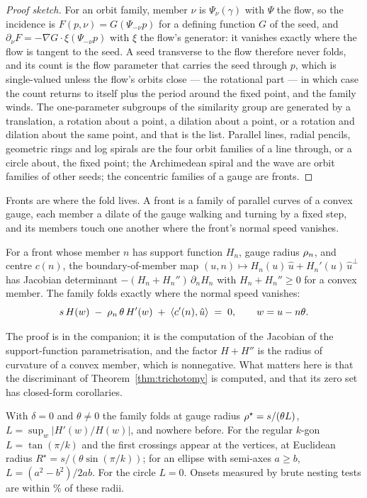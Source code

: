 \begin{proof}[Proof sketch]
For an orbit family, member $\nu$ is $\Psi_\nu(\gamma)$ with $\Psi$ the flow,
so the incidence is $F(p,\nu)=G(\Psi_{-\nu}p)$ for a defining function $G$
of the seed, and $\partial_\nu F=-\nabla G\cdot\xi(\Psi_{-\nu}p)$ with $\xi$
the flow's generator: it vanishes exactly where the flow is tangent to the
seed. A seed transverse to the flow therefore never folds, and its count is
the flow parameter that carries the seed through $p$, which is single-valued
unless the flow's orbits close --- the rotational part --- in which case the
count returns to itself plus the period around the fixed point, and the
family winds. The one-parameter subgroups of the similarity group are
generated by a translation, a rotation about a point, a dilation about a
point, or a rotation and dilation about the same point, and that is the list.
Parallel lines, radial pencils, geometric rings and log spirals are the four
orbit families of a line through, or a circle about, the fixed point; the
Archimedean spiral and the wave are orbit families of other seeds; the
concentric families of a gauge are fronts.
\end{proof}

Fronts are where the fold lives. A front is a family of parallel curves of a
convex gauge, each member a dilate of the gauge walking and turning by a
fixed step, and its members touch one another where the front's normal speed
vanishes.

\begin{lemma}
\label{lem:foldlaw}
For a front whose member $n$ has support function $H_n$, gauge radius
$\rho_n$, and centre $c(n)$, the boundary-of-member map
$(u,n)\mapsto H_n(u)\,\hat u+H_n'(u)\,\hat u^{\perp}$ has Jacobian determinant
$-(H_n+H_n'')\,\partial_n H_n$ with $H_n+H_n''\ge0$ for a convex member. The
family folds exactly where the normal speed vanishes:
\[
  s\,H(w)\;-\;\rho_n\,\theta\,H'(w)\;+\;\langle c'(n),\hat u\rangle\;=\;0,
  \qquad w=u-n\theta .
\]
\end{lemma}

The proof is in the companion; it is the computation of the Jacobian of the
support-function parametrisation, and the factor $H+H''$ is the radius of
curvature of a convex member, which is nonnegative. What matters here is that
the discriminant of Theorem~\ref{thm:trichotomy} is computed, and that its
zero set has closed-form corollaries.

\begin{corollary}
\label{cor:rotation}
With $\delta=0$ and $\theta\ne0$ the family folds at gauge radius
$\rho^\star=s/(\theta L)$, $L=\sup_w|H'(w)/H(w)|$, and nowhere before. For the
regular $k$-gon $L=\tan(\pi/k)$ and the first crossings appear at the vertices,
at Euclidean radius $R^\star=s/(\theta\sin(\pi/k))$; for an ellipse with
semi-axes $a\ge b$, $L=(a^2-b^2)/2ab$. For the circle $L=0$. Onsets measured
by brute nesting tests are within \foldWorstOnsetPct\% of these radii.
\end{corollary}

